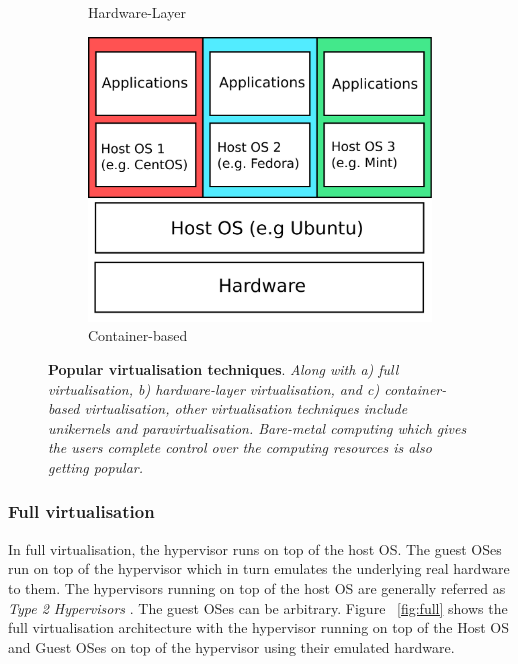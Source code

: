 \begin{figure}[t]
\begin{subfigure}[b]{0.32\textwidth}
  \caption{Hardware-Layer }
  \label{fig:hardware}
   \end{subfigure} 
   \hfill
    \begin{subfigure}[b]{0.32\textwidth}  
   \centering
  \includegraphics[width=\textwidth, keepaspectratio]{containers.png}%
  \caption{Container-based}
  \label{fig:container}
\end{subfigure}
\caption{{\bf Popular virtualisation techniques}. {\sl Along with a) full virtualisation, b) hardware-layer virtualisation, and c) container-based virtualisation, other virtualisation techniques include unikernels and paravirtualisation. Bare-metal computing which gives the users complete control over the computing resources is also getting popular.}}
\label{fig:virtualisationtechs}
\end{figure}

\subsubsection{Full virtualisation}

In full virtualisation, the hypervisor runs on top of the host OS. The guest OSes run on top of the hypervisor which in turn emulates the underlying real hardware to them. The hypervisors running on top of the host OS are generally referred as \textit{Type 2 Hypervisors} \cite{eder2016hypervisor}. The guest OSes can be arbitrary. Figure ~\ref{fig:full} shows the full virtualisation architecture with the hypervisor running on top of the Host OS and Guest OSes on top of the hypervisor using their emulated hardware. 




